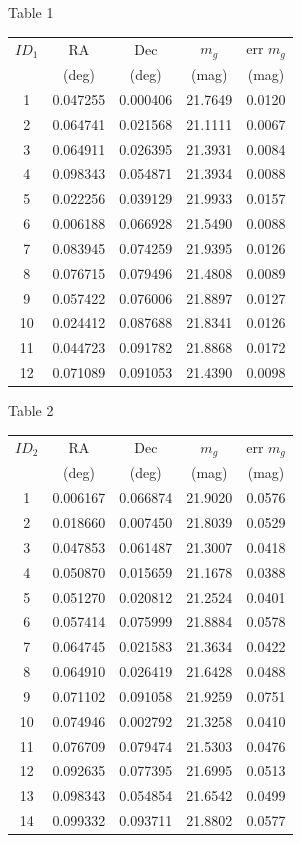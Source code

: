 \begin{center}
Table 1\\[2pt]
\begin{tabular}{ccccc}
$ID_1$ & RA & Dec & $m_g$ & err $m_g$ \\
 & (deg) & (deg) & (mag) & (mag) \\
\hline
1 & 0.047255 & 0.000406 & 21.7649 & 0.0120 \\
2 & 0.064741 & 0.021568 & 21.1111 & 0.0067 \\
3 & 0.064911 & 0.026395 & 21.3931 & 0.0084 \\
4 & 0.098343 & 0.054871 & 21.3934 & 0.0088 \\
5 & 0.022256 & 0.039129 & 21.9933 & 0.0157 \\
6 & 0.006188 & 0.066928 & 21.5490 & 0.0088 \\
7 & 0.083945 & 0.074259 & 21.9395 & 0.0126 \\
8 & 0.076715 & 0.079496 & 21.4808 & 0.0089 \\
9 & 0.057422 & 0.076006 & 21.8897 & 0.0127 \\
10 & 0.024412 & 0.087688 & 21.8341 & 0.0126 \\
11 & 0.044723 & 0.091782 & 21.8868 & 0.0172 \\
12 & 0.071089 & 0.091053 & 21.4390 & 0.0098 \\
\end{tabular}
\end{center}

\begin{center}
Table 2\\[2pt]
\begin{tabular}{ccccc}
$ID_2$ & RA & Dec & $m_g$ & err $m_g$ \\
 & (deg) & (deg) & (mag) & (mag) \\
\hline
1 & 0.006167 & 0.066874 & 21.9020 & 0.0576 \\
2 & 0.018660 & 0.007450 & 21.8039 & 0.0529 \\
3 & 0.047853 & 0.061487 & 21.3007 & 0.0418 \\
4 & 0.050870 & 0.015659 & 21.1678 & 0.0388 \\
5 & 0.051270 & 0.020812 & 21.2524 & 0.0401 \\
6 & 0.057414 & 0.075999 & 21.8884 & 0.0578 \\
7 & 0.064745 & 0.021583 & 21.3634 & 0.0422 \\
8 & 0.064910 & 0.026419 & 21.6428 & 0.0488 \\
9 & 0.071102 & 0.091058 & 21.9259 & 0.0751 \\
10 & 0.074946 & 0.002792 & 21.3258 & 0.0410 \\
11 & 0.076709 & 0.079474 & 21.5303 & 0.0476 \\
12 & 0.092635 & 0.077395 & 21.6995 & 0.0513 \\
13 & 0.098343 & 0.054854 & 21.6542 & 0.0499 \\
14 & 0.099332 & 0.093711 & 21.8802 & 0.0577 \\
\end{tabular}
\end{center}

